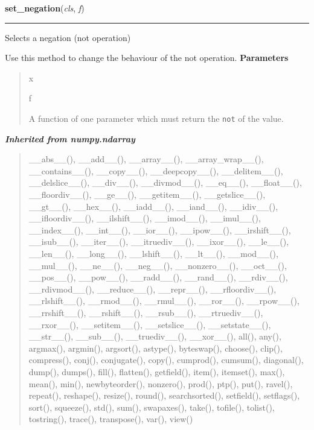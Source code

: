 \hspace{.8\funcindent}\begin{boxedminipage}{\funcwidth}

    \raggedright \textbf{set\_negation}(\textit{cls}, \textit{f})

    \vspace{-1.5ex}

    \rule{\textwidth}{0.5\fboxrule}
\setlength{\parskip}{2ex}

Selects a negation (not operation)

Use this method to change the behaviour of the not operation.
\setlength{\parskip}{1ex}
      \textbf{Parameters}
      \vspace{-1ex}

      \begin{quote}
        \begin{Ventry}{x}

          \item[f]


A function of one parameter which must return the \texttt{not} of the
value.
        \end{Ventry}

      \end{quote}

    \end{boxedminipage}


\large{\textbf{\textit{Inherited from numpy.ndarray}}}

\begin{quote}
\_\_abs\_\_(), \_\_add\_\_(), \_\_array\_\_(), \_\_array\_wrap\_\_(), \_\_contains\_\_(), \_\_copy\_\_(), \_\_deepcopy\_\_(), \_\_delitem\_\_(), \_\_delslice\_\_(), \_\_div\_\_(), \_\_divmod\_\_(), \_\_eq\_\_(), \_\_float\_\_(), \_\_floordiv\_\_(), \_\_ge\_\_(), \_\_getitem\_\_(), \_\_getslice\_\_(), \_\_gt\_\_(), \_\_hex\_\_(), \_\_iadd\_\_(), \_\_iand\_\_(), \_\_idiv\_\_(), \_\_ifloordiv\_\_(), \_\_ilshift\_\_(), \_\_imod\_\_(), \_\_imul\_\_(), \_\_index\_\_(), \_\_int\_\_(), \_\_ior\_\_(), \_\_ipow\_\_(), \_\_irshift\_\_(), \_\_isub\_\_(), \_\_iter\_\_(), \_\_itruediv\_\_(), \_\_ixor\_\_(), \_\_le\_\_(), \_\_len\_\_(), \_\_long\_\_(), \_\_lshift\_\_(), \_\_lt\_\_(), \_\_mod\_\_(), \_\_mul\_\_(), \_\_ne\_\_(), \_\_neg\_\_(), \_\_nonzero\_\_(), \_\_oct\_\_(), \_\_pos\_\_(), \_\_pow\_\_(), \_\_radd\_\_(), \_\_rand\_\_(), \_\_rdiv\_\_(), \_\_rdivmod\_\_(), \_\_reduce\_\_(), \_\_repr\_\_(), \_\_rfloordiv\_\_(), \_\_rlshift\_\_(), \_\_rmod\_\_(), \_\_rmul\_\_(), \_\_ror\_\_(), \_\_rpow\_\_(), \_\_rrshift\_\_(), \_\_rshift\_\_(), \_\_rsub\_\_(), \_\_rtruediv\_\_(), \_\_rxor\_\_(), \_\_setitem\_\_(), \_\_setslice\_\_(), \_\_setstate\_\_(), \_\_str\_\_(), \_\_sub\_\_(), \_\_truediv\_\_(), \_\_xor\_\_(), all(), any(), argmax(), argmin(), argsort(), astype(), byteswap(), choose(), clip(), compress(), conj(), conjugate(), copy(), cumprod(), cumsum(), diagonal(), dump(), dumps(), fill(), flatten(), getfield(), item(), itemset(), max(), mean(), min(), newbyteorder(), nonzero(), prod(), ptp(), put(), ravel(), repeat(), reshape(), resize(), round(), searchsorted(), setfield(), setflags(), sort(), squeeze(), std(), sum(), swapaxes(), take(), tofile(), tolist(), tostring(), trace(), transpose(), var(), view()
\end{quote}

